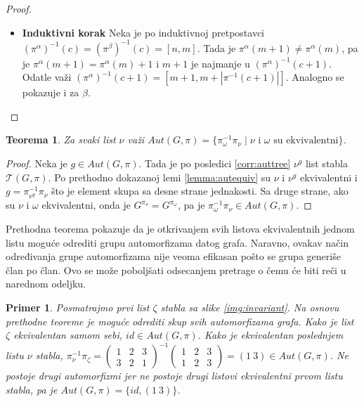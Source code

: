 \documentclass[12pt,oneside]{memoir}
\newtheorem{theorem}{Teorema}
\newtheorem{example}{Primer}
\theoremstyle{definition}
\begin{document}
\begin{proof}
\begin{enumerate}
\begin{itemize}
				  \item[] \textbf{Induktivni korak} Neka je po induktivnoj
					  pretpostavci $(\pi^\alpha)^{-1}(c) = (\pi^\beta)^{-1}(c)
					  = [n, m]$. Tada je $\pi^\alpha(m+1) \neq \pi^\alpha(m)$,
					  pa je $\pi^\alpha(m+1) = \pi^\alpha(m) + 1$ i $m+1$ je
					  najmanje u $(\pi^\alpha)^{-1}(c+1)$. Odatle važi
					  $(\pi^\alpha)^{-1}(c+1) = [m + 1, m + |\pi^{-1}(c+1)|]$.
					  Analogno se pokazuje i za $\beta$.
			  \end{itemize}
	  \end{enumerate}
  \end{proof}

  \begin{theorem}
	  \label{thm:aut}
	  Za svaki list $\nu$ važi $Aut(G, \pi) = \{\pi_{\omega}^{-1}\pi_{\nu}
	  \mid \text{$\nu$ i $\omega$ su ekvivalentni} \}$.
  \end{theorem}
  
  \begin{proof}
	  Neka je $g \in Aut(G, \pi)$. Tada je po posledici \ref{corr:auttree}
	  $\nu^g$ list stabla $\mathcal{T}(G, \pi)$. Po prethodno dokazanoj lemi
	  \ref{lemma:autequiv} su $\nu$ i $\nu^g$ ekvivalentni i $g =
	  \pi_{\nu^g}^{-1}\pi_\nu$ što je element skupa sa desne strane jednakosti.
	  Sa druge strane, ako su $\nu$ i $\omega$ ekvivalentni, onda je
	  $G^{\pi_\nu} = G^{\pi_\omega}$, pa je $\pi_\omega^{-1}\pi_\nu \in Aut(G,
	  \pi)$.
  \end{proof}

	Prethodna teorema pokazuje da je otkrivanjem svih listova ekvivalentnih
	jednom listu moguće odrediti grupu automorfizama datog grafa. Naravno,
	ovakav način određivanja grupe automorfizama nije veoma efikasan pošto se
	grupa generiše član po član. Ovo se može poboljšati odsecanjem pretrage o
	čemu će biti reči u narednom odeljku.
	
	\begin{example}
		Posmatrajmo prvi list $\zeta$ stabla sa slike \ref{img:invariant}. Na
		osnovu prethodne teoreme je moguće odrediti skup svih automorfizama
		grafa.  Kako je list $\zeta$ ekvivalentan samom sebi, $id \in
		Aut(G, \pi)$.  Kako je ekvivalentan poslednjem listu $\nu$ stabla,
		$\pi_\nu^{-1}\pi_\zeta = \begin{pmatrix}1 & 2 & 3\\3 & 2 &
			1\end{pmatrix}^{-1}\begin{pmatrix}1 & 2 & 3\\1 & 2 &
		3\end{pmatrix}=(1\ 3) \in Aut(G, \pi)$. Ne postoje drugi automorfizmi
		jer ne postoje drugi listovi ekvivalentni prvom listu stabla, pa je
		$Aut(G, \pi) = \{id, (1\ 3)\}$.
	\end{example}
\end{document}
